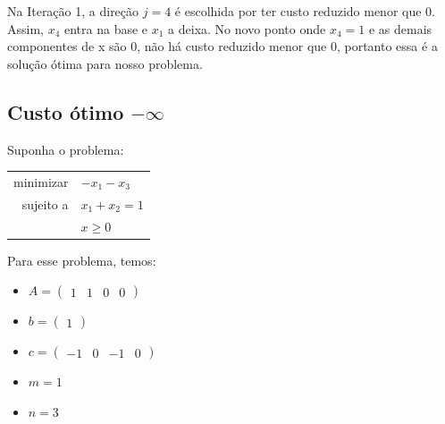 \documentclass[12pt]{article}
\begin{document}
	Na Iteração 1, a direção $j = 4$ é escolhida por ter custo reduzido menor que 0. Assim, $x_4$ entra na base e $x_1$ a deixa. No novo ponto onde $x_4 = 1$ e as demais componentes de x são 0, não há custo reduzido menor que 0, portanto essa é a solução ótima para nosso problema.
	
	\subsection{Custo ótimo $-\infty$}
	Suponha o problema:
	\begin{center}	
    	\begin{tabular}{r l}
	  		minimizar & $-x_1 - x_3$ \\
        
        	sujeito a & $x_1 + x_2 = 1$ \\
            & $x \geq 0$ \\
        \end{tabular}
    \end{center}
    
        Para esse problema, temos: 
	   
	\begin{itemize}
	\item $A = \begin{pmatrix}
    1 & 1 & 0 & 0
    \end{pmatrix}$
    
	\item $b = \begin{pmatrix}
    1 
    \end{pmatrix} $
    
    \item $c = \begin{pmatrix}
    -1 & 0 & -1 & 0
    \end{pmatrix}$
    
    \item $m = 1$
    
    \item $n = 3$
	\end{itemize}

	\lstset {firstnumber=1}	
	
\end{document}
